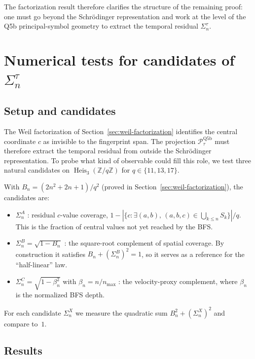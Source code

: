 \documentclass[11pt]{article}
\begin{document}
    The factorization result therefore clarifies the structure of the remaining proof:
    one must go beyond the Schr\"odinger representation and work at the level of the
    Q5b principal-symbol geometry to extract the temporal residual $\Sigma_n^\tau$.

  \section{Numerical tests for candidates of \texorpdfstring{$\Sigma_n^\tau$}{Sigma\_n\^{}tau}}
  \label{sec:numerical}

  \subsection{Setup and candidates}

    The Weil factorization of Section~\ref{sec:weil-factorization} identifies the
    central coordinate $c$ as invisible to the fingerprint span.
    The projection $\mathcal{P}_\tau^{\mathrm{Q5b}}$ must therefore extract the
    temporal residual from outside the Schr\"odinger representation.
    To probe what kind of observable could fill this role, we test three natural
    candidates on $\operatorname{Heis}_3(\mathbb{Z}/q\mathbb{Z})$ for
    $q \in \{11,13,17\}$.

    With $B_n = (2n^2+2n+1)/q^2$ (proved in Section~\ref{sec:weil-factorization}),
    the candidates are:

    \begin{itemize}
      \item $\Sigma_n^A$ : residual $c$-value coverage,
      $1 - |\{c : \exists(a,b),\,(a,b,c)\in\bigcup_{k\leq n}S_k\}|/q$.
      This is the fraction of central values not yet reached by the BFS.
      \item $\Sigma_n^B = \sqrt{1-B_n}$ :
      the square-root complement of spatial coverage.
      By construction it satisfies $B_n + (\Sigma_n^B)^2 = 1$, so it serves
      as a reference for the ``half-linear'' law.
      \item $\Sigma_n^C = \sqrt{1-\beta_n^2}$ with $\beta_n = n/n_{\max}$ :
      the velocity-proxy complement, where $\beta_n$ is the normalized BFS depth.
    \end{itemize}

    For each candidate $\Sigma_n^X$ we measure the quadratic sum
    $B_n^2 + (\Sigma_n^X)^2$ and compare to~$1$.

  \subsection{Results}
\end{document}
